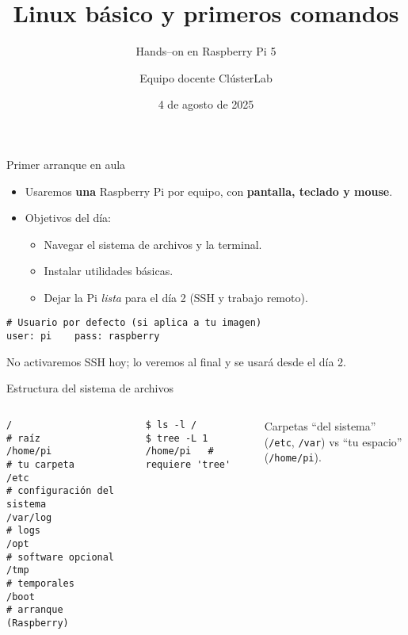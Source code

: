 \documentclass[aspectratio=169,professionalfonts]{beamer}
\title[ClústerLab • Día 1]{Linux básico y primeros comandos}
\subtitle{Hands--on en Raspberry Pi 5}
\author{Equipo docente ClústerLab}
\date{4 de agosto de 2025}
\begin{document}
\begin{frame}[plain]
  \titlepage
\end{frame}

\begin{frame}[fragile]{Primer arranque en aula}
\begin{itemize}
  \item Usaremos \textbf{una} Raspberry Pi por equipo, con \textbf{pantalla, teclado y mouse}.
  \item Objetivos del día:
  \begin{itemize}
    \item Navegar el sistema de archivos y la terminal.
    \item Instalar utilidades básicas.
    \item Dejar la Pi \textit{lista} para el día 2 (SSH y trabajo remoto).
  \end{itemize}
\end{itemize}
\begin{verbatim}
# Usuario por defecto (si aplica a tu imagen)
user: pi    pass: raspberry
\end{verbatim}
\begin{infobox}
No activaremos SSH hoy; lo veremos al final y se usará desde el día 2.
\end{infobox}
\end{frame}

\begin{frame}[fragile]{Estructura del sistema de archivos}
\begin{columns}[T,onlytextwidth]
\begin{verbatim}
/                    # raíz
/home/pi             # tu carpeta
/etc                 # configuración del sistema
/var/log             # logs
/opt                 # software opcional
/tmp                 # temporales
/boot                # arranque (Raspberry)
\end{verbatim}
\begin{verbatim}
$ ls -l /
$ tree -L 1 /home/pi   # requiere 'tree'
\end{verbatim}
\begin{infobox}
Carpetas “del sistema” (\texttt{/etc}, \texttt{/var}) vs “tu espacio” (\texttt{/home/pi}).
\end{infobox}
\end{columns}
\end{frame}
\end{document}
